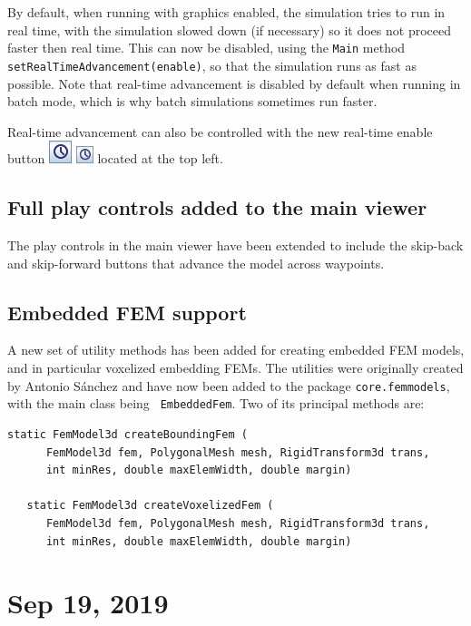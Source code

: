 \documentclass{article}
\begin{document}
By default, when running with graphics enabled, the simulation tries
to run in real time, with the simulation slowed down (if necessary) so
it does not proceed faster then real time. This can now be disabled,
using the {\tt Main} method {\tt setRealTimeAdvancement(enable)}, so
that the simulation runs as fast as possible. Note that real-time
advancement is disabled by default when running in batch mode, which
is why batch simulations sometimes run faster.

Real-time advancement can also be controlled with the new {\sf
real-time enable} button
\iflatexml
\includegraphics[]{../uiguide/images/realtimeEnable} 
\else
\includegraphics[width=0.2in]{../uiguide/images/realtimeEnable} 
\fi
located at the top left.

\subsection*{Full play controls added to the main viewer}

The play controls in the main viewer have been extended to include the
skip-back and skip-forward buttons that advance the model across
waypoints.

\subsection*{Embedded FEM support}

A new set of utility methods has been added for creating embedded FEM
models, and in particular voxelized embedding FEMs. The utilities were
originally created by Antonio S\'{a}nchez and have now been added to the
package {\tt core.femmodels}, with the main class being {\tt
EmbeddedFem}. Two of its principal methods are:
%
\begin{lstlisting}[]
   static FemModel3d createBoundingFem (
      FemModel3d fem, PolygonalMesh mesh, RigidTransform3d trans, 
      int minRes, double maxElemWidth, double margin)

   static FemModel3d createVoxelizedFem (
      FemModel3d fem, PolygonalMesh mesh, RigidTransform3d trans, 
      int minRes, double maxElemWidth, double margin)
\end{lstlisting}
%

\section*{Sep 19, 2019}
\end{document}
